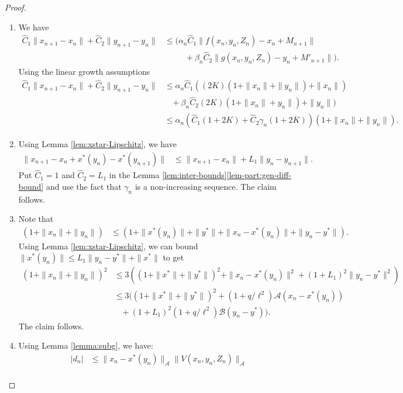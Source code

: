 \documentclass[10pt,a4paper]{amsart}
\newcommand{\Acal}{\mathcal{A}}
\newcommand{\Bcal}{\mathcal{B}}
\newcommand{\hC}{\hat{C}}
\newcommand{\xstar}{x^*}
\begin{document}
\begin{proof}
    \begin{enumerate}[label=(\alph*)]
        \item We have
    \begin{align*}
        \hC_1\|x_{n+1}-x_n\|+\hC_2\|y_{n+1}-y_n\|
        &\leq \Bigg(\alpha_n\hC_1\|f(x_n, y_n, Z_n)-x_n+M_{n+1}\|\\
        &\;\;\;\;\;\;\;\;\;+\beta_n\hC_2\|g(x_n,y_n,Z_n)- y_n+ M'_{n+1}\|\Bigg).
    \end{align*}
    Using the linear growth assumptions
    \begin{align*}
        \hC_1\|x_{n+1}-x_n\|+\hC_2\|y_{n+1}-y_n\|
        &\leq \alpha_n\hC_1((2K)(1+\|x_n\|+\|y_n\|)+\|x_n\|)\\
        &\;\;\;+\beta_n\hC_2(2K)(1+\|x_n\|+y_n\|)+\|y_n\|)\\
        &\leq \alpha_n\left(\hC_1(1+2K)+\hC_2\gamma_n(1+2K)\right)(1+\|x_n\|+\|y_n\|).
    \end{align*}
    \item     Using Lemma \ref{lem:xstar-Lipschitz}, we have
    \begin{align*}
        \|x_{n+1}-x_n+\xstar(y_n)-\xstar(y_{n+1})\|
        &\leq \|x_{n+1}-x_n\|+L_1\|y_n-y_{n+1}\|.
    \end{align*}
    Put $\hC_1=1$ and $\hC_2=L_1$ in the Lemma \ref{lem:inter-bounds}\ref{lem-part:gen-diff-bound} and use the fact that $\gamma_n$ is a non-increasing sequence. The claim follows.
    \item Note that
    \begin{align*}
        (1+\|x_n\|+\|y_n\|)
        &\leq (1+\|x^*(y_n)\|+\|y^*\|+\|x_n-x^*(y_n)\|+\|y_n-y^*\|).
    \end{align*}
    Using Lemma \ref{lem:xstar-Lipschitz}, we can bound $\|x^*(y_n)\|\leq L_1\|y_n-y^*\|+\|x^*\|$ to get
    \begin{align*}
        (1+\|x_n\|+\|y_n\|)^2&\leq 3((1+\|x^*\|+\|y^*\|)^2+\|x_n-x^*(y_n)\|^2+(1+L_1)^2\|y_n-y^*\|^2)\\
        &\leq 3((1+\|x^*\|+\|y^*\|)^2+(1+q/\ell^2)\Acal(x_n-x^*(y_n))\\
        &\;\;\;+(1+L_1)^2(1+q/\ell^2)\Bcal(y_n-y^*)).
    \end{align*}
    The claim follows. 
    \item Using Lemma \ref{lemma:subg}, we have:
    \begin{align*}
        |d_n|&\leq \|x_n-\xstar(y_n)\|_\Acal\|V(x_n,y_n,Z_n)\|_\Acal\\

\end{align*}
\end{enumerate}
\end{proof}
\end{document}
